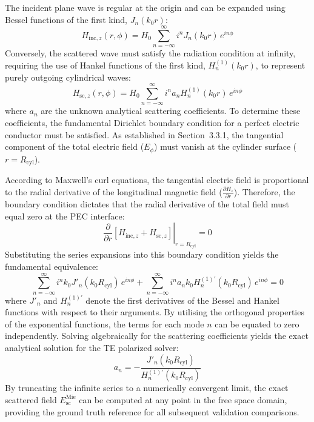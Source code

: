 \vspace{12pt}

The incident plane wave is regular at the origin and can be expanded using Bessel functions of the first kind, $J_n(k_0 r)$:
\begin{equation}
H_{\text{inc},z}(r, \phi) = H_0 \sum_{n=-\infty}^{\infty} i^n J_n(k_0 r) \, e^{in\phi}
\label{eq:mie_inc}
\end{equation}
Conversely, the scattered wave must satisfy the radiation condition at infinity, requiring the use of Hankel functions of the first kind, $H_n^{(1)}(k_0 r)$, to represent purely outgoing cylindrical waves:
\begin{equation}
H_{\text{sc},z}(r, \phi) = H_0 \sum_{n=-\infty}^{\infty} i^n a_n H_n^{(1)}(k_0 r) \, e^{in\phi}
\label{eq:mie_scat}
\end{equation}
where $a_n$ are the unknown analytical scattering coefficients. To determine these coefficients, the fundamental Dirichlet boundary condition for a perfect electric conductor must be satisfied. As established in Section~3.3.1, the tangential component of the total electric field ($E_\phi$) must vanish at the cylinder surface ($r = R_{\text{cyl}}$).

\vspace{12pt}

According to Maxwell's curl equations, the tangential electric field is proportional to the radial derivative of the longitudinal magnetic field ($\frac{\partial H_z}{\partial r}$). Therefore, the boundary condition dictates that the radial derivative of the total field must equal zero at the PEC interface:
\begin{equation}
\left. \frac{\partial}{\partial r} \left[ H_{\text{inc},z} + H_{\text{sc},z} \right] \right|_{r=R_{\text{cyl}}} = 0
\label{eq:mie_bc}
\end{equation}
Substituting the series expansions into this boundary condition yields the fundamental equivalence:
\begin{equation}
\sum_{n=-\infty}^{\infty} i^n k_0 J'_n(k_0 R_{\text{cyl}}) \, e^{in\phi} + \sum_{n=-\infty}^{\infty} i^n a_n k_0 H_n^{(1)\prime}(k_0 R_{\text{cyl}}) \, e^{in\phi} = 0
\label{eq:mie_bc_expanded}
\end{equation}
where $J'_n$ and $H_n^{(1)\prime}$ denote the first derivatives of the Bessel and Hankel functions with respect to their arguments. By utilising the orthogonal properties of the exponential functions, the terms for each mode $n$ can be equated to zero independently. Solving algebraically for the scattering coefficients yields the exact analytical solution for the TE polarized solver:
\begin{equation}
a_n = -\frac{J'_n(k_0 R_{\text{cyl}})}{H_n^{(1)\prime}(k_0 R_{\text{cyl}})}
\label{eq:mie_an}
\end{equation}
By truncating the infinite series to a numerically convergent limit, the exact scattered field $E_{\text{sc}}^{\text{Mie}}$ can be computed at any point in the free space domain, providing the ground truth reference for all subsequent validation comparisons.

